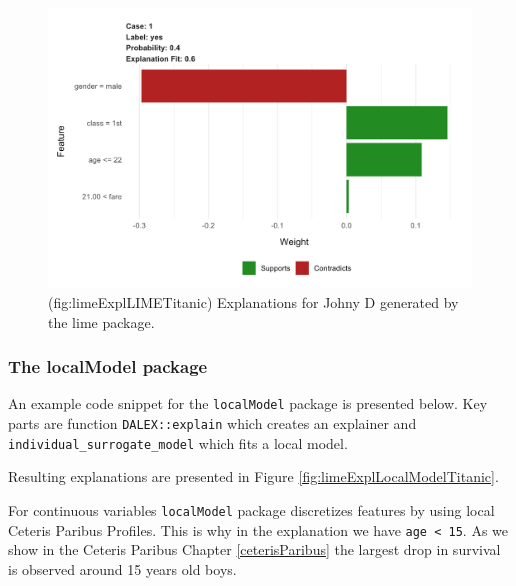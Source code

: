 \documentclass[12pt,]{krantz}
\theoremstyle{definition}
\theoremstyle{definition}
\theoremstyle{definition}
\theoremstyle{remark}
\begin{document}
\begin{figure}

{\centering \includegraphics[width=0.8\linewidth]{figure/lime_expl_lime_titanic} 

}

\caption{(fig:limeExplLIMETitanic) Explanations for Johny D generated by the lime package. }\label{fig:limeExplLIMETitanic}
\end{figure}

\hypertarget{the-localmodel-package}{%
\subsubsection{\texorpdfstring{\textbf{The localModel
package}}{The localModel package}}\label{the-localmodel-package}}

An example code snippet for the \texttt{localModel} package is presented
below. Key parts are function \texttt{DALEX::explain} which creates an
explainer and \texttt{individual\_surrogate\_model} which fits a local
model.

Resulting explanations are presented in Figure
\ref{fig:limeExplLocalModelTitanic}.

For continuous variables \texttt{localModel} package discretizes
features by using local Ceteris Paribus Profiles. This is why in the
explanation we have \texttt{age\ \textless{}\ 15}. As we show in the
Ceteris Paribus Chapter \ref{ceterisParibus} the largest drop in
survival is observed around 15 years old boys.
\end{document}
